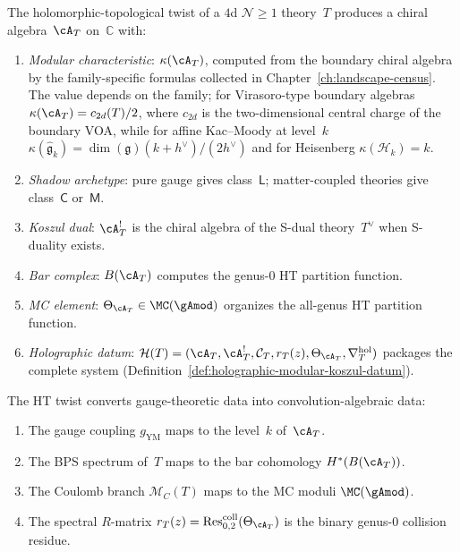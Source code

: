 \begin{construction}
\label{constr:ht-shadow-data}
The holomorphic-topological twist of a $4$d $\mathcal{N} \geq 1$
theory~$T$ produces a chiral algebra~$\cA_T$ on~$\mathbb{C}$ with:
\begin{enumerate}[label=\textup{(\roman*)}]
\item \emph{Modular characteristic}:
 $\kappa(\cA_T)$, computed from the boundary chiral
 algebra by the family-specific formulas collected in
 Chapter~\ref{ch:landscape-census}. The value depends on
 the family; for Virasoro-type boundary algebras
 $\kappa(\cA_T) = c_{2d}(T)/2$, where $c_{2d}$ is the
 two-dimensional central charge of the boundary VOA,
 while for affine Kac--Moody at level~$k$
 $\kappa(\widehat{\mathfrak{g}}_k) = \dim(\mathfrak{g})(k+h^\vee)/(2h^\vee)$
 and for Heisenberg $\kappa(\mathcal{H}_k) = k$.
\item \emph{Shadow archetype}: pure gauge gives
 class~$\mathsf{L}$; matter-coupled theories give
 class~$\mathsf{C}$ or~$\mathsf{M}$.
\item \emph{Koszul dual}: $\cA_T^!$ is the chiral algebra of the
 S-dual theory~$T^\vee$ when S-duality exists.
\item \emph{Bar complex}: $B(\cA_T)$ computes the genus-$0$ HT
 partition function.
\item \emph{MC element}:
 $\Theta_{\cA_T} \in \MC(\gAmod)$ organizes the all-genus
 HT partition function.
\item \emph{Holographic datum}:
 $\mathcal{H}(T) = (\cA_T, \cA_T^!, \mathcal{C}_T, r_T(z),
 \Theta_{\cA_T}, \nabla^{\mathrm{hol}}_T)$ packages the complete
 system
 \textup{(}Definition~\textup{\ref{def:holographic-modular-koszul-datum}}\textup{)}.
\end{enumerate}
\end{construction}

\begin{construction}
\label{constr:ht-cg-principle}
The HT twist converts gauge-theoretic data into convolution-algebraic
data:
\begin{enumerate}[label=\textup{(\roman*)}]
\item The gauge coupling $g_{\mathrm{YM}}$ maps to the level~$k$
 of~$\cA_T$.
\item The BPS spectrum of~$T$ maps to the bar cohomology
 $H^*(B(\cA_T))$.
\item The Coulomb branch $\mathcal{M}_C(T)$ maps to the MC moduli
 $\MC(\gAmod)$.
\item The spectral $R$-matrix
 $r_T(z) = \operatorname{Res}^{\mathrm{coll}}_{0,2}(\Theta_{\cA_T})$
 is the binary genus-$0$ collision residue.
\end{enumerate}
\end{construction}

